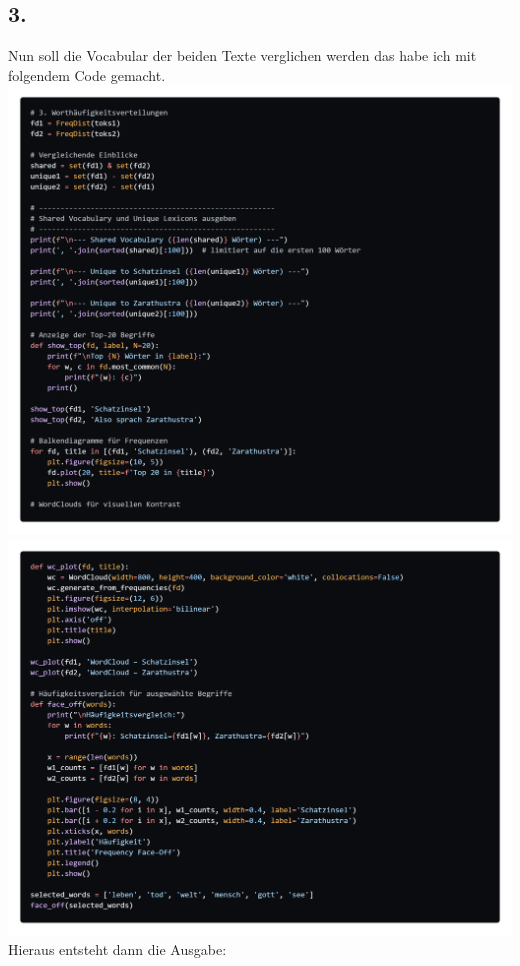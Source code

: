 \documentclass{scrartcl}
\begin{document}
\subsection*{3.}
Nun soll die Vocabular der beiden Texte verglichen werden das habe ich mit folgendem Code gemacht.\\
\includegraphics*[scale=0.25]{freq.png}\\
\includegraphics*[scale=0.25]{freq2.png}\\
Hieraus entsteht dann die Ausgabe:\\
\end{document}

